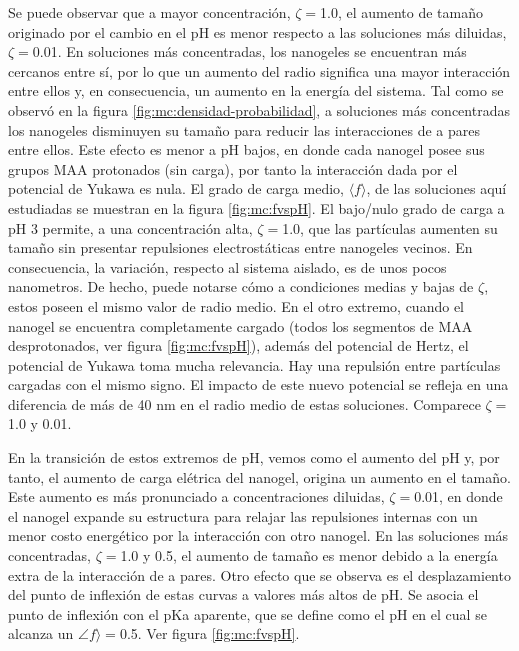 	Se puede observar que a mayor concentraci\'on, $\zeta = $1.0, el aumento de tama\~no originado por el cambio en el pH es menor respecto a las soluciones m\'as diluidas, $\zeta = $0.01.
	En soluciones m\'as concentradas, los nanogeles se encuentran m\'as cercanos entre s\'i, por lo que un aumento del radio significa una mayor interacci\'on entre ellos y, en consecuencia, un aumento en la energ\'ia del sistema.
	Tal como se observ\'o en la figura \ref{fig:mc:densidad-probabilidad}, a soluciones m\'as concentradas los nanogeles disminuyen su tama\~no para reducir las interacciones de a pares entre ellos. Este efecto es menor a pH bajos, en donde cada nanogel posee sus grupos MAA protonados (sin carga), por tanto la interacción dada por el potencial de Yukawa es nula. El grado de carga medio, $\langle f \rangle$, de las soluciones aqu\'i estudiadas se muestran en la figura \ref{fig:mc:fvspH}.
	El bajo/nulo grado de carga a pH 3 permite, a una concentraci\'on alta, $\zeta = $1.0, que las part\'iculas aumenten su tama\~no sin presentar repulsiones electrost\'aticas entre nanogeles vecinos. En consecuencia, la variaci\'on, respecto al sistema aislado, es de unos pocos nanometros. De hecho, puede notarse c\'omo a condiciones medias y bajas de $\zeta$, estos poseen el mismo valor de radio medio.
	En el otro extremo, cuando el nanogel se encuentra completamente cargado (todos los segmentos de MAA desprotonados, ver figura \ref{fig:mc:fvspH}), adem\'as del potencial de Hertz, el potencial de Yukawa toma mucha relevancia. Hay una repulsi\'on entre part\'iculas cargadas con el mismo signo. El impacto de este nuevo potencial se refleja en una diferencia de m\'as de 40 nm en el radio medio de estas soluciones. Comparece $\zeta = $1.0 y 0.01.
	
	En la transici\'on de estos extremos de pH, vemos como el aumento del pH y, por tanto, el aumento de carga el\'etrica del nanogel, origina un aumento en el tama\~no. Este aumento es m\'as pronunciado a concentraciones diluidas, $\zeta = $0.01, en donde el nanogel expande su estructura para relajar las repulsiones internas con un menor costo energ\'etico por la interacci\'on con otro nanogel. En las soluciones m\'as concentradas, $\zeta = $1.0 y 0.5, el aumento de tama\~no es menor debido a la energ\'ia extra de la interacci\'on de a pares.
	Otro efecto que se observa es el desplazamiento del punto de inflexi\'on de estas curvas a valores m\'as altos de pH.
	Se asocia el punto de inflexi\'on con el pKa aparente, que se define como el pH en el cual se alcanza un $\angle f \rangle= $0.5. Ver figura \ref{fig:mc:fvspH}.
	
